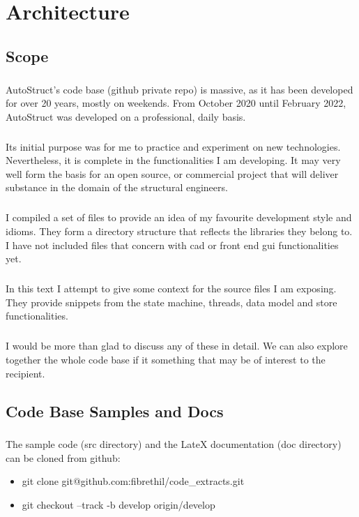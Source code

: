 \chapter{Architecture}
\section{Scope}
\paragraph{}
AutoStruct's code base (github private repo) is massive, as it has been developed for over 20 years, mostly on weekends. From October 2020 until February 2022, AutoStruct was developed on a professional, daily basis.
\paragraph{}
Its initial purpose was for me to practice and experiment on new technologies. Nevertheless, it is complete in the functionalities I am developing. It may very well form the basis for an open source, or commercial project that will deliver substance in the domain of the structural engineers.
\paragraph{}
I compiled a set of files to provide an idea of my favourite development style and idioms. They form a directory structure that reflects the libraries they belong to. I have not included files that concern with cad or front end gui functionalities yet.
\paragraph{}
In this text I attempt to give some context for the source files I am exposing. They provide snippets from the state machine, threads, data model and store functionalities.
\paragraph{}
I would be more than glad to discuss any of these in detail. We can also explore together the whole code base if it something that may be of interest to the recipient.
\section{Code Base Samples and Docs}
\paragraph{}
The sample code (src directory) and the LateX documentation (doc directory) can be cloned from github:
\begin{itemize}
\item git clone git@github.com:fibrethil/code\_extracts.git
\item git checkout --track -b develop origin/develop
\end{itemize}
